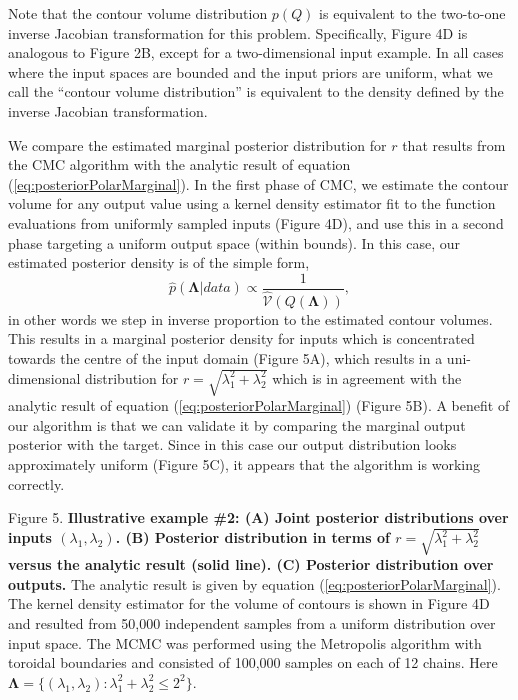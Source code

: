 \documentclass[10pt,letterpaper]{article}
\begin{document}
Note that the contour volume distribution $p(Q)$ is equivalent to the two-to-one inverse Jacobian transformation for this problem. Specifically, Figure 4D is analogous to Figure 2B, except for a two-dimensional input example. In all cases where the input spaces are bounded and the input priors are uniform, what we call the ``contour volume distribution'' is equivalent to the density defined by the inverse Jacobian transformation.

%
We compare the estimated marginal posterior distribution for $r$ that results from the CMC algorithm with the analytic result of equation (\ref{eq:posteriorPolarMarginal}). In the first phase of CMC, we estimate the contour volume for any output value using a kernel density estimator fit to the function evaluations from uniformly sampled inputs (Figure 4D), and use this in a second phase targeting a uniform output space (within bounds). In this case, our estimated posterior density is of the simple form,
%
\begin{equation}
\hat{p}(\boldsymbol{\Lambda}|data) \propto \frac{1}{\widehat{\mathcal{V}}(Q(\boldsymbol{\Lambda}))},
\end{equation}
%
in other words we step in inverse proportion to the estimated contour volumes. This results in a marginal posterior density for inputs which is concentrated towards the centre of the input domain (Figure 5A), which results in a uni-dimensional distribution for $r=\sqrt{\lambda_1^2+\lambda_2^2}$ which is in agreement with the analytic result of equation (\ref{eq:posteriorPolarMarginal}) (Figure 5B). A benefit of our algorithm is that we can validate it by comparing the marginal output posterior with the target. Since in this case our output distribution looks approximately uniform (Figure 5C), it appears that the algorithm is working correctly.

\vspace{0.5cm}

Figure 5. \textbf{Illustrative example \#2: (A) Joint posterior distributions over inputs $(\lambda_1,\lambda_2)$. (B) Posterior distribution in terms of $r=\sqrt{\lambda_1^2+\lambda_2^2}$ versus the analytic result (solid line). (C) Posterior distribution over outputs.} The analytic result is given by equation (\ref{eq:posteriorPolarMarginal}). The kernel density estimator for the volume of contours is shown in Figure 4D and resulted from 50,000 independent samples from a uniform distribution over input space. The MCMC was performed using the Metropolis algorithm with toroidal boundaries and consisted of 100,000 samples on each of 12 chains. Here $\boldsymbol{\Lambda} = \{ (\lambda_1,\lambda_2): \lambda_1^2+\lambda_2^2\leq2^2 \}$.
\end{document}
